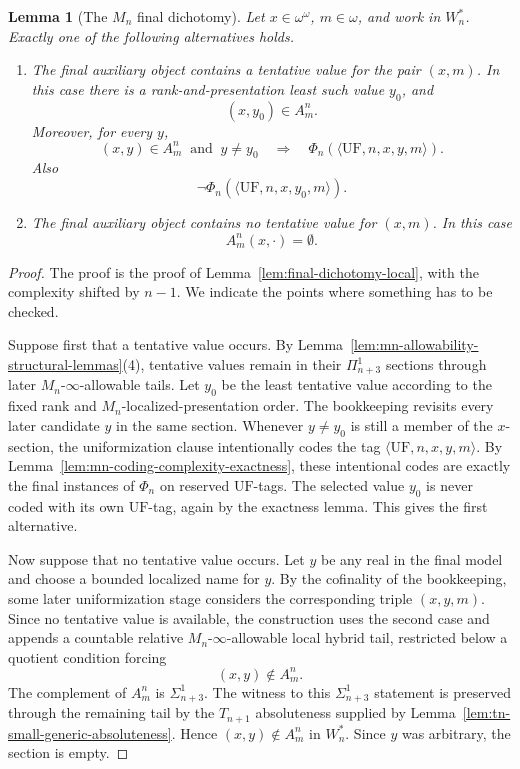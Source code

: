 \documentclass[a4paper,11pt]{article}
\newtheorem{lemma}[theorem]{Lemma}
\begin{document}
\begin{lemma}[The $M_n$ final dichotomy]\label{lem:final-dichotomy-mn}
Let $x\in\omega^\omega$, $m\in\omega$, and work in $W_n^\ast$.  Exactly one of the following alternatives holds.
\begin{enumerate}
   \item The final auxiliary object contains a tentative value for the pair $(x,m)$.  In this case there is a rank-and-presentation least such value $y_0$, and
   \[
      (x,y_0)\in A^n_m.
   \]
   Moreover, for every $y$,
   \[
      (x,y)\in A^n_m\ \text{ and }\ y\neq y_0
      \quad\Longrightarrow\quad
      \Phi_n(\langle\mathrm{UF},n,x,y,m\rangle).
   \]
   Also
   \[
      \neg\Phi_n(\langle\mathrm{UF},n,x,y_0,m\rangle).
   \]

   \item The final auxiliary object contains no tentative value for $(x,m)$.  In this case
   \[
      A^n_m(x,\cdot)=\emptyset .
   \]
\end{enumerate}
\end{lemma}

\begin{proof}
The proof is the proof of Lemma~\ref{lem:final-dichotomy-local}, with the complexity shifted by $n-1$.  We indicate the points where something has to be checked.

Suppose first that a tentative value occurs.  By Lemma~\ref{lem:mn-allowability-structural-lemmas}(4), tentative values remain in their $\Pi^1_{n+3}$ sections through later $M_n$-$\infty$-allowable tails.  Let $y_0$ be the least tentative value according to the fixed rank and $M_n$-localized-presentation order.  The bookkeeping revisits every later candidate $y$ in the same section.  Whenever $y\neq y_0$ is still a member of the $x$-section, the uniformization clause intentionally codes the tag $\langle\mathrm{UF},n,x,y,m\rangle$.  By Lemma~\ref{lem:mn-coding-complexity-exactness}, these intentional codes are exactly the final instances of $\Phi_n$ on reserved $\mathrm{UF}$-tags.  The selected value $y_0$ is never coded with its own $\mathrm{UF}$-tag, again by the exactness lemma.  This gives the first alternative.

Now suppose that no tentative value occurs.  Let $y$ be any real in the final model and choose a bounded localized name for $y$.  By the cofinality of the bookkeeping, some later uniformization stage considers the corresponding triple $(x,y,m)$.  Since no tentative value is available, the construction uses the second case and appends a countable relative $M_n$-$\infty$-allowable local hybrid tail, restricted below a quotient condition forcing
\[
   (x,y)\notin A^n_m.
\]
The complement of $A^n_m$ is $\Sigma^1_{n+3}$.  The witness to this $\Sigma^1_{n+3}$ statement is preserved through the remaining tail by the $T_{n+1}$ absoluteness supplied by Lemma~\ref{lem:tn-small-generic-absoluteness}.  Hence $(x,y)\notin A^n_m$ in $W_n^\ast$.  Since $y$ was arbitrary, the section is empty.
\end{proof}
\end{document}
